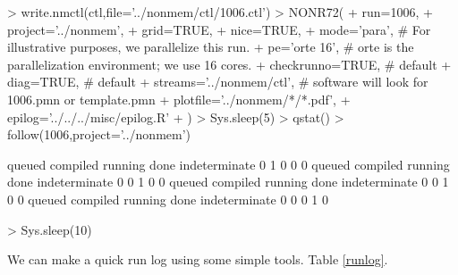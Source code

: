 \begin{Schunk}
\begin{Sinput}
> write.nmctl(ctl,file='../nonmem/ctl/1006.ctl')
> NONR72(
+      run=1006,
+      project='../nonmem',
+      grid=TRUE,
+      nice=TRUE,
+      mode='para',                         # For illustrative purposes, we parallelize this run.
+      pe='orte 16',                        # orte is the parallelization environment; we use 16 cores.
+      checkrunno=TRUE,                     # default
+      diag=TRUE,                           # default
+      streams='../nonmem/ctl',             # software will look for 1006.pmn or template.pmn
+      plotfile='../nonmem/*/*.pdf',
+      epilog='../../../misc/epilog.R'
+ )
> Sys.sleep(5)
> qstat()
> follow(1006,project='../nonmem')
\end{Sinput}
\begin{Soutput}
       queued      compiled       running          done indeterminate 
            0             1             0             0             0 
       queued      compiled       running          done indeterminate 
            0             0             1             0             0 
       queued      compiled       running          done indeterminate 
            0             0             1             0             0 
       queued      compiled       running          done indeterminate 
            0             0             0             1             0 
\end{Soutput}
\begin{Sinput}
> Sys.sleep(10)
\end{Sinput}
\end{Schunk}
We can make a quick run log using some simple tools. Table \ref{runlog}.
